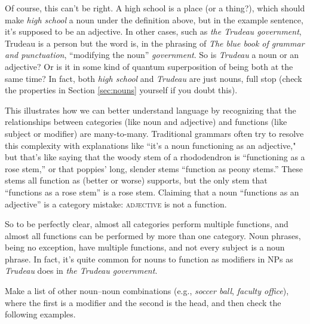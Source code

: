 Of course, this can't be right. A high school is a place (or a thing?), which should make \textit{high school} a noun under the definition above, but in the example sentence, it's supposed to be an adjective. In other cases, such as \textit{the Trudeau government}, Trudeau is a person but the word is, in the phrasing of \textit{The blue book of grammar and punctuation}, ``modifying the noun'' \textit{government}. So is \textit{Trudeau} a noun or an adjective? Or is it in some kind of quantum superposition of being both at the same time? In fact, both \textit{high school} and \textit{Trudeau} are just nouns, full stop (check the properties in Section \ref{sec:nouns} yourself if you doubt this).

This illustrates how we can better understand language by recognizing that the relationships between categories (like noun and adjective) and functions (like subject or modifier) are many-to-many. Traditional grammars often try to resolve this complexity with explanations like ``it's a noun functioning as an adjective," but that's like saying that the woody stem of a rhododendron is ``functioning as a rose stem,'' or that poppies' long, slender stems ``function as peony stems.'' These stems all function as (better or worse) supports, but the only stem that ``functions as a rose stem'' is a rose stem. Claiming that a noun ``functions as an adjective'' is a category mistake: \textsc{adjective} is not a function.

So to be perfectly clear, almost all categories perform multiple functions, and almost all functions can be performed by more than one category. Noun phrases, being no exception, have multiple functions, and not every subject is a noun phrase. In fact, it's quite common for nouns to function as modifiers in NPs as \textit{Trudeau} does in \textit{the Trudeau government}.

Make a list of other noun–noun combinations (e.g., \textit{soccer ball}, \textit{faculty office}), where the first is a modifier and the second is the head, and then check the following examples.

